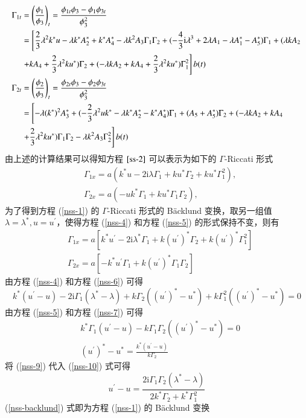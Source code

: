 \begin{align}
  \Gamma_{1t} &= \left(\frac{\phi_1}{\phi_3}\right)_t=\frac{\phi_{1t}\phi_3-\phi_1\phi_{3t}}{\phi_3^2} \notag \\
  &= \left[\frac{2}{3}\lambda^{2}k^{*}u - \lambda k^{*}A_{2}^{*} + k^{*}A_{4}^{*} - \lambda k^{2}A_{3}\Gamma_{1}\Gamma_{2} + (-\frac{4}{3}\mathrm{i}\lambda^{3} + 2\lambda A_{1} - \lambda A_{1}^{*} - A_{5}^{*})\Gamma_{1} + (\lambda kA_{2} \right. \notag\\
  & \left. + kA_{4} + \frac{2}{3}\lambda^{2}ku^{*})\Gamma_{2} + (-\lambda kA_{2} + kA_{4} + \frac{2}{3}\lambda^{2}ku^{*})\Gamma_{1}^{2}\right] b(t)  \label{nss-g1t} \\
  \Gamma_{2t} &=\left(\frac{\phi_2}{\phi_3}\right)_t=\frac{\phi_{2t}\phi_3-\phi_2\phi_{3t}}{\phi_3^2} \notag \\
  &= \left[ -\lambda(k^{*})^{2}A_{3}^{*} + (-\frac{2}{3}\lambda^{2}uk^{*} - \lambda k^{*}A_{2}^{*} - k^{*}A_{4}^{*})\Gamma_{1} + (A_{5}+A_{5}^{*})\Gamma_{2} + (-\lambda kA_{2} +kA_{4} \right. \notag\\
  & \left. + \frac{2}{3}\lambda^{2}ku^{*})\Gamma_{1}\Gamma_{2} - \lambda k^{2}A_{3}\Gamma_{2}^{2} \right] b(t) \label{nss-g2t}
\end{align}
由上述的计算结果可以得知方程 $\ref{ss-2}$ 可以表示为如下的 $\Gamma$-Riccati 形式
\begin{align}
  & \Gamma_{1x} = a(k^{*}u - 2\mathrm{i}\lambda \Gamma_{1} + ku^{*}\Gamma_{2} + ku^{*}\Gamma_{1}^{2}), \label{nss-4} \\
  & \Gamma_{2x} = a(-uk^{*}\Gamma_{1} + ku^{*}\Gamma_{1}\Gamma_{2}), \label{nss-5}
\end{align}
为了得到方程 (\ref{nss-1}) 的 $\Gamma$-Riccati 形式的 B\"acklund 变换，取另一组值 $\lambda = \lambda^{*}, u = u^{'}$，使得方程 (\ref{nss-4}) 和方程 (\ref{nss-5}) 的形式保持不变，则有
\begin{align}
  & \Gamma_{1x} = a\left[k^{*}u^{'} - 2\mathrm{i}\lambda^{*}\Gamma_{1} + k(u^{'})^{*}\Gamma_{2} + k(u^{'})^{*}\Gamma_{1}^{2}\right]  \label{nss-6}\\
  & \Gamma_{2x} = a\left[-k^{*}u^{'}\Gamma_{1} + k(u^{'})^{*}\Gamma_{1}\Gamma_{2}\right]  \label{nss-7}
\end{align}
由方程 (\ref{nss-4}) 和方程 (\ref{nss-6}) 可得
\begin{equation}
  k^{*}(u^{'}-u) - 2\mathrm{i}\Gamma_{1}(\lambda^{*}-\lambda) + k\Gamma_{2}((u^{'})^{*}-u^{*}) + k\Gamma_{1}^{2}((u^{'})^{*}-u^{*}) = 0  \label{nss-10}
\end{equation}
由方程 (\ref{nss-5}) 和方程 (\ref{nss-7}) 可得
\begin{align}
  & k^{*}\Gamma_{1}(u^{'}-u) - k\Gamma_{1}\Gamma_{2}((u^{'})^{*}-u^{*}) = 0 \\
  & (u^{'})^{*} - u^{*} = \frac{k^{*}(u^{'}-u)}{k\Gamma_{2}}  \label{nss-9}
\end{align}
将 (\ref{nss-9}) 代入 (\ref{nss-10}) 式可得
\begin{equation}
  u^{'} - u = \frac{2\mathrm{i}\Gamma_{1}\Gamma_{2}(\lambda^{*}-\lambda)}{2k^{*}\Gamma_{2} + k^{*}\Gamma_{1}^{2}} \label{nss-backlund}
\end{equation}
(\ref{nss-backlund}) 式即为方程 (\ref{nss-1}) 的 B\"acklund 变换

